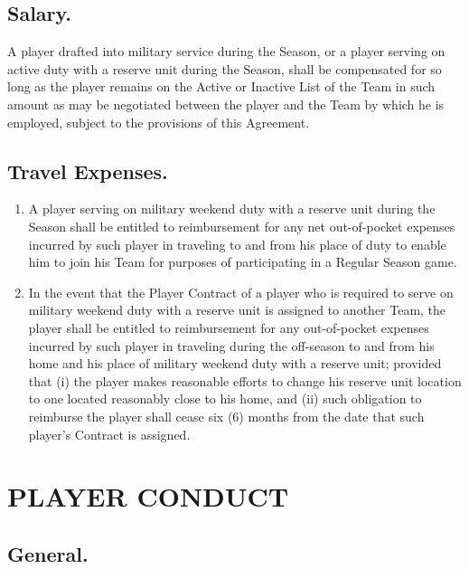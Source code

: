 \documentclass[
]{book}
\providecommand{\tightlist}{%
  \setlength{\itemsep}{0pt}\setlength{\parskip}{0pt}}
\begin{document}

\hypertarget{salary.}{%
\section{Salary.}\label{salary.}}

A player drafted into military service during the Season, or a player serving on active duty with a reserve unit during the Season, shall be compensated for so long as the player remains on the Active or Inactive List of the Team in such amount as may be negotiated between the player and the Team by which he is employed, subject to the provisions of this Agreement.

\hypertarget{travel-expenses.}{%
\section{Travel Expenses.}\label{travel-expenses.}}

\begin{enumerate}
\def\labelenumi{(\alph{enumi})}
\tightlist
\item
  A player serving on military weekend duty with a reserve unit during the Season shall be entitled to reimbursement for any net out-of-pocket expenses incurred by such player in traveling to and from his place of duty to enable him to join his Team for purposes of participating in a Regular Season game.
\item
  In the event that the Player Contract of a player who is required to serve on military weekend duty with a reserve unit is assigned to another Team, the player shall be entitled to reimbursement for any out-of-pocket expenses incurred by such player in traveling during the off-season to and from his home and his place of military weekend duty with a reserve unit; provided that (i) the player makes reasonable efforts to change his reserve unit location to one located reasonably close to his home, and (ii) such obligation to reimburse the player shall cease six (6) months from the date that such player's Contract is assigned.
\end{enumerate}

\hypertarget{player-conduct}{%
\chapter{PLAYER CONDUCT}\label{player-conduct}}

\hypertarget{general.-1}{%
\section{General.}\label{general.-1}}
\end{document}
